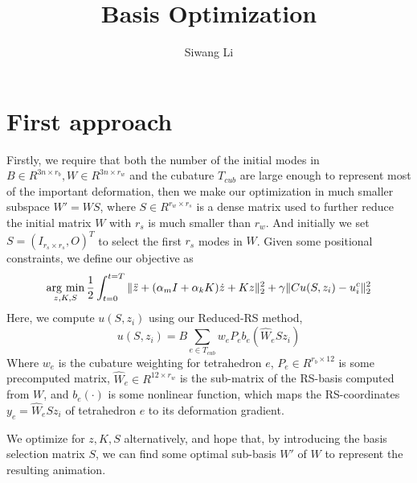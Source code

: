\documentclass[9pt,twocolumn]{extarticle}
\author{Siwang Li}
\title{Basis Optimization}
\newcommand{\argmin}{\operatornamewithlimits{arg\ min}}
\begin{document}
\maketitle

\setlength{\parskip}{0.5ex}

\section{First approach}
Firstly, we require that both the number of the initial modes in $B\in
R^{3n\times r_b},W\in R^{3n\times r_w}$ and the cubature $T_{cub}$ are large
enough to represent most of the important deformation, then we make our
optimization in much smaller subspace $W'=WS$, where $S\in R^{r_w\times r_s}$ is
a dense matrix used to further reduce the initial matrix $W$ with $r_s$ is much
smaller than $r_w$. And initially we set $S=(I_{r_s\times r_s},O)^T$ to select
the first $r_s$ modes in $W$. Given some positional constraints, we define our
objective as
\begin{equation} \label{obj_w}
    \argmin_{z,K,S} \frac{1}{2}\int_{t=0}^{t=T}\|\ddot{z}+(\alpha_mI+\alpha_kK)\dot{z}+Kz\|_2^2+\gamma\|Cu(S,z_i)-u_i^c\|_2^2
\end{equation}
Here, we compute $u(S,z_i)$ using our Reduced-RS method,
\begin{equation} \label{redrs_s}
  u(S,z_i) = B\sum_{e\in T_{cub}}w_eP_eb_e(\hat{W}_eSz_i)
\end{equation}
Where $w_e$ is the cubature weighting for tetrahedron $e$, $P_e\in R^{r_b\times
  12}$ is some precomputed matrix, $\hat{W}_e\in R^{12\times r_w}$ is the
sub-matrix of the RS-basis computed from $W$, and $b_e(\cdot)$ is some nonlinear
function, which maps the RS-coordinates $y_e=\hat{W}_eSz_i$ of tetrahedron $e$
to its deformation gradient.

We optimize for $z,K,S$ alternatively, and hope that, by introducing the basis
selection matrix $S$, we can find some optimal sub-basis $W'$ of $W$ to
represent the resulting animation.
\end{document}
